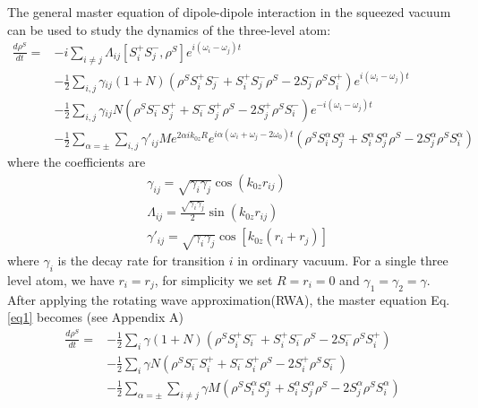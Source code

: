 \documentclass{article}
\begin{document}
The general master equation of dipole-dipole interaction in the squeezed vacuum can be used to study the dynamics of the three-level atom\cite{You2018}:
\begin{equation}
\label{eq1}
\begin{split}
\frac{d\rho^{S}}{dt}=&-i\underset{i\neq j}{\sum}\Lambda_{ij}[S_{i}^{+}S_{j}^{-},\rho^{S}]e^{i(\omega_{i}-\omega_{j})t}\\
&-\frac{1}{2}\underset{i,j}{\sum}\gamma{}_{ij}(1+N)(\rho^{S}S_{i}^{+}S_{j}^{-}+S_{i}^{+}S_{j}^{-}\rho^{S}-2S_{j}^{-}\rho^{S}S_{i}^{+})e^{i(\omega_{i}-\omega_{j})t} \\
&-\frac{1}{2}\underset{i,j}{\sum}\gamma{}_{ij}N(\rho^{S}S_{i}^{-}S_{j}^{+}+S_{i}^{-}S_{j}^{+}\rho^{S}-2S_{j}^{+}\rho^{S}S_{i}^{-})e^{-i(\omega_{i}-\omega_{j})t}\\
&-\frac{1}{2}\sum_{\alpha=\pm}\underset{i,j}{\sum}\gamma'_{ij}Me^{2\alpha ik_{0z}R}e^{i\alpha(\omega_i+\omega_j-2\omega_0)t}(\rho^{S}S_{i}^{\alpha}S_{j}^{\alpha}+S_{i}^{\alpha}S_{j}^{\alpha}\rho^{S}-2S_{j}^{\alpha}\rho^{S}S_{i}^{\alpha})
\end{split}
\end{equation}
where the coefficients are
\begin{equation}
\label{eq2}
\begin{split}
& \gamma_{ij}=\sqrt{\gamma_{i}\gamma_{j}}\cos(k_{0z}r_{ij}) \\
& \Lambda_{ij}=\frac{\sqrt{\gamma_{i}\gamma_{j}}}{2}\sin(k_{0z}r_{ij})\\
& \gamma'_{ij}=\sqrt{\gamma_{i}\gamma_{j}}\cos[k_{0z}(r_{i}+r_{j})]
\end{split}
\end{equation}
where $\gamma_{i}$ is the decay rate for transition $i$ in ordinary vacuum. For a single three level atom, we have $r_i=r_j$, for simplicity we set $R=r_i=0$ and $\gamma_1=\gamma_2=\gamma$. After applying the rotating wave approximation(RWA), the master equation Eq.\eqref{eq1} becomes (see Appendix A)
\begin{equation}
\label{eq3}
\begin{split}
\frac{d\rho^{S}}{dt}=&-\frac{1}{2}\underset{i}{\sum}\gamma(1+N)(\rho^{S}S_{i}^{+}S_{i}^{-}+S_{i}^{+}S_{i}^{-}\rho^{S}-2S_{i}^{-}\rho^{S}S_{i}^{+})\\
&-\frac{1}{2}\underset{i}{\sum}\gamma N(\rho^{S}S_{i}^{-}S_{i}^{+}+S_{i}^{-}S_{i}^{+}\rho^{S}-2S_{i}^{+}\rho^{S}S_{i}^{-})\\
&-\frac{1}{2}\sum_{\alpha=\pm}\underset{i\ne j}{\sum}\gamma M(\rho^{S}S_{i}^{\alpha}S_{j}^{\alpha}+S_{i}^{\alpha}S_{j}^{\alpha}\rho^{S}-2S_{j}^{\alpha}\rho^{S}S_{i}^{\alpha})
\end{split}
\end{equation}
\end{document}
